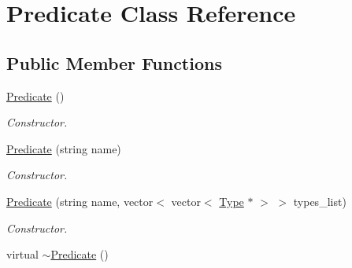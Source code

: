 \hypertarget{classPredicate}{\section{Predicate Class Reference}
\label{classPredicate}
}
\subsection*{Public Member Functions}
\begin{DoxyCompactItemize}
\item 
\hypertarget{classPredicate_a50088fcbd7632e6be3b2df62441535af}{\hyperlink{classPredicate_a50088fcbd7632e6be3b2df62441535af}{Predicate} ()}\label{classPredicate_a50088fcbd7632e6be3b2df62441535af}

\begin{DoxyCompactList}\small\item\em Constructor. \end{DoxyCompactList}\item 
\hyperlink{classPredicate_a13a0daedf2d69ab8ab3b741e997bfd1e}{Predicate} (string name)
\begin{DoxyCompactList}\small\item\em Constructor. \end{DoxyCompactList}\item 
\hyperlink{classPredicate_a69abfad91bb95f47b5467724c99217b9}{Predicate} (string name, vector$<$ vector$<$ \hyperlink{classType}{Type} $\ast$ $>$ $>$ types\+\_\+list)
\begin{DoxyCompactList}\small\item\em Constructor. \end{DoxyCompactList}\item 
\hypertarget{classPredicate_a6209b4f29454bccd0164a743b168620f}{virtual \hyperlink{classPredicate_a6209b4f29454bccd0164a743b168620f}{$\sim$\+Predicate} ()}\label{classPredicate_a6209b4f29454bccd0164a743b168620f}


\end{DoxyCompactItemize}
